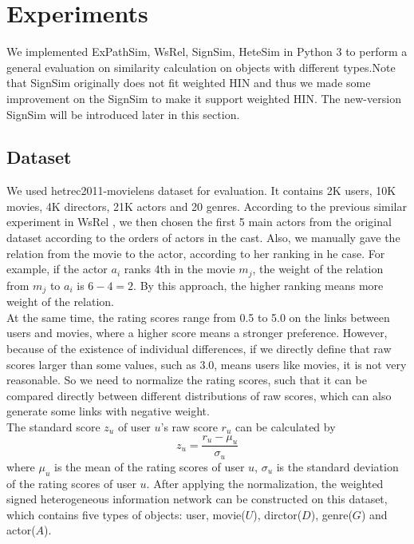 \documentclass{acm_proc_article-csis8101}
\begin{document}
\section{Experiments}
We implemented ExPathSim, WsRel, SignSim, HeteSim in Python 3 to perform a general evaluation on similarity calculation on objects with different types.Note that SignSim originally does not fit weighted HIN and thus we made some improvement on the SignSim to make it support weighted HIN. The new-version SignSim will be introduced later in this section.
\subsection{Dataset}
We used hetrec2011-movielens\cite{cantador2011second} dataset for evaluation. It contains 2K users, 10K movies, 4K directors, 21K actors and 20 genres. According to the previous similar experiment in WsRel \cite{zhu2017measuring}, we then chosen the ﬁrst 5 main actors from the original dataset according to the orders of actors in the cast. Also, we manually gave the relation from the movie to the actor, according to her ranking in he case. For example, if the actor $a_{i}$ ranks 4th in the movie $m_{j}$, the weight of the relation from $m_{j}$ to $a_{i}$ is $6 - 4=2$. By this approach, the higher ranking means more weight of the relation. \\

At the same time, the rating scores range from 0.5 to 5.0 on the links between users and movies, where a higher score means a stronger preference. However, because of the existence of individual differences, if we directly deﬁne that raw scores larger than some values, such as 3.0, means users like movies, it is not very reasonable. So we need to normalize the rating scores, such that it can be compared directly between different distributions of raw scores, which can also generate some links with negative weight. \\
The standard score $z_{u}$ of user $u$'s raw score $r_{u}$ can be calculated by
\begin{equation}
z_{u} = \dfrac{r_{u} - \mu_{u}}{\sigma_{u}}
\end{equation}
where $\mu_{u}$ is the mean of the rating scores of user $u$, $\sigma_{u}$ is the standard deviation of the rating scores of user $u$. After applying the normalization, the weighted signed heterogeneous information network can be constructed on this dataset, which contains five types of objects: user, movie($U$), dirctor($D$), genre($G$) and actor($A$).\\
\end{document}
